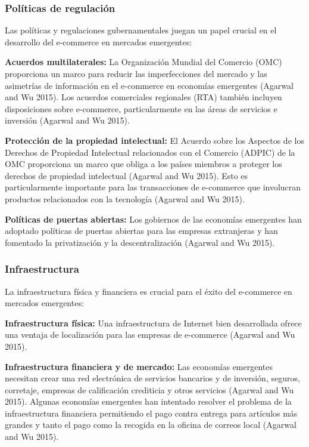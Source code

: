 \documentclass{article}
\begin{document}
\subsubsection{Políticas de
regulación}\label{poluxedticas-de-regulaciuxf3n}

Las políticas y regulaciones gubernamentales juegan un papel crucial en
el desarrollo del e-commerce en mercados emergentes:

\textbf{Acuerdos multilaterales:} La Organización Mundial del Comercio
(OMC) proporciona un marco para reducir las imperfecciones del mercado y
las asimetrías de información en el e-commerce en economías emergentes
(Agarwal and Wu 2015). Los acuerdos comerciales regionales (RTA) también
incluyen disposiciones sobre e-commerce, particularmente en las áreas de
servicios e inversión (Agarwal and Wu 2015).

\textbf{Protección de la propiedad intelectual:} El Acuerdo sobre los
Aspectos de los Derechos de Propiedad Intelectual relacionados con el
Comercio (ADPIC) de la OMC proporciona un marco que obliga a los países
miembros a proteger los derechos de propiedad intelectual (Agarwal and
Wu 2015). Esto es particularmente importante para las transacciones de
e-commerce que involucran productos relacionados con la tecnología
(Agarwal and Wu 2015).

\textbf{Políticas de puertas abiertas:} Los gobiernos de las economías
emergentes han adoptado políticas de puertas abiertas para las empresas
extranjeras y han fomentado la privatización y la descentralización
(Agarwal and Wu 2015).

\subsubsection{Infraestructura}\label{infraestructura}

La infraestructura física y financiera es crucial para el éxito del
e-commerce en mercados emergentes:

\textbf{Infraestructura física:} Una infraestructura de Internet bien
desarrollada ofrece una ventaja de localización para las empresas de
e-commerce (Agarwal and Wu 2015).

\textbf{Infraestructura financiera y de mercado:} Las economías
emergentes necesitan crear una red electrónica de servicios bancarios y
de inversión, seguros, corretaje, empresas de calificación crediticia y
otros servicios (Agarwal and Wu 2015). Algunas economías emergentes han
intentado resolver el problema de la infraestructura financiera
permitiendo el pago contra entrega para artículos más grandes y tanto el
pago como la recogida en la oficina de correos local (Agarwal and Wu
2015).
\end{document}
